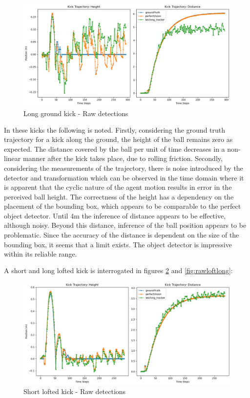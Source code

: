 \documentclass[a4paper,twoside,12pt]{report}
\begin{document}
\begin{figure}[h!]
\begin{center}
\includegraphics[width=14cm]{images/raw_ground_long.png}
\caption{Long ground kick - Raw detections}
\label{fig:rawgroundlong}
\end{center}
\end{figure}

In these kicks the following is noted. Firstly, considering the ground truth trajectory for a kick along the ground, the height of the ball remains zero as expected. The distance covered by the ball per unit of time decreases in a non-linear manner after the kick takes place, due to rolling friction. Secondly, considering the measurements of the trajectory, there is noise introduced by the detector and transformation which can be observed in the time domain where it is apparent that the cyclic nature of the agent motion results in error in the perceived ball height. The correctness of the height has a dependency on the placement of the bounding box, which appears to be comparable to the perfect object detector. Until 4m the inference of distance appears to be effective, although noisy. Beyond this distance, inference of the ball position appears to be problematic. Since the accuracy of the distance is dependent on the size of the bounding box, it seems that a limit exists. The object detector is impressive within its reliable range.

A short and long lofted kick is interrogated in figures \ref{fig:rawloftshort} and \ref{fig:rawloftlong}:

\begin{figure}[h!]
\begin{center}
\includegraphics[width=14cm]{images/raw_loft_short.png}
\caption{Short lofted kick - Raw detections}
\label{fig:rawloftshort}
\end{center}
\end{figure}
\end{document}
